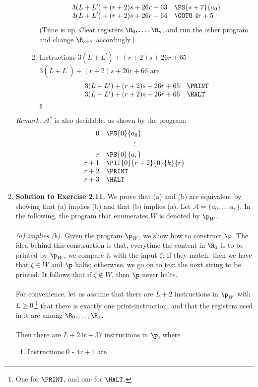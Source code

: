 \begin{enumerate}[1.]
\begin{enumerate}[(a)]
\begin{enumerate}[(1)]
\[\begin{array}{rl}
3(L + L^\prime) + (r + 2)s + 26r + 63 & \PS{s + 7}{a_0} \cr
3(L + L^\prime) + (r + 2)s + 26r + 64 & \GOTO \ 4r + 5
\end{array}
\]
(Time is up. Clear registers $\R_0, \ldots, \R_s$, and run the other program and change $\R_{s + 7}$ accordingly.)
\item Instructions $3(L + L^\prime) + (r + 2)s + 26r + 65$ - $3(L + L^\prime) + (r + 2)s + 26r + 66$ are
\[
\begin{array}{rl}
3(L + L^\prime) + (r + 2)s + 26r + 65 & \PRINT \cr
3(L + L^\prime) + (r + 2)s + 26r + 66 & \HALT
\end{array}
\]\nolinebreak\hfill$\talloblong$
\end{enumerate}
\end{enumerate}
\textit{Remark.} $\mathcal{A}^\ast$ is also decidable, as shown by the program:
\[
\begin{array}{rl}
0 & \PS{0}{a_0} \cr
\multicolumn{2}{c}{\vdots} \cr
r & \PS{0}{a_r} \cr
r + 1 & \PII{0}{r + 2}{0}{k}{r} \cr
r + 2 & \PRINT \cr
r + 3 & \HALT
\end{array}
\]
%
\item \textbf{Solution to Exercise 2.11.} We prove that (a) and (b) are equivalent by showing that (a) implies (b) and that (b) implies (a). Let $\mathcal{A} = \{ a_0, \ldots, a_r \}$. In the following, the program that enumerates $W$ is denoted by $\p_W$.\\
\ \\
\emph{(a) implies (b).} Given the program $\p_W$, we show how to construct $\p$. The idea behind this construction is that, everytime the content in $\R_0$ is to be printed by $\p_W$, we compare it with the input $\zeta$: If they match, then we have that $\zeta \in W$ and $\p$ halts; otherwise, we go on to test the next string to be printed. It follows that if $\zeta \not\in W$, then $\p$ never halts.\\
\ \\
For convenience, let us assume that there are $L + 2$ instructions in $\p_W$ with $L \geq 0$,\footnote{One for $\PRINT$, and one for $\HALT$.} that there is exactly one print-instruction, and that the registers used in it are among $\R_0, \ldots, \R_s$.\\
\ \\
Then there are $L + 24r + 37$ instructions in $\p$, where
\begin{enumerate}[(1)]
\item Instructions $0$ - $4r + 4$ are
\[
\begin{array}{rl}

\end{array}\]
\end{enumerate}
\end{enumerate}
